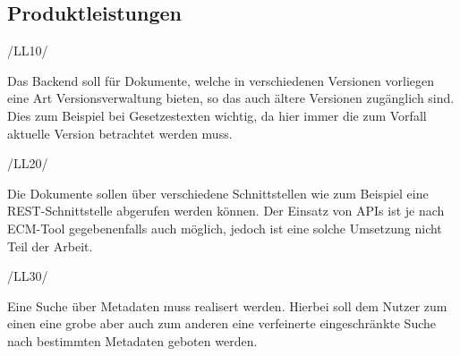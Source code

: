 \subsection{Produktleistungen} \label{Produktleistungen}
\begin{minipage}{3cm}
/LL10/
\end{minipage}
\begin{minipage}{13cm}
Das Backend soll f\"ur Dokumente, welche in verschiedenen Versionen vorliegen eine Art Versionsverwaltung bieten, so das auch \"altere Versionen zug\"anglich sind. Dies zum Beispiel bei Gesetzestexten wichtig, da hier immer die zum Vorfall aktuelle Version betrachtet werden muss.\\
\end{minipage}
\begin{minipage}{3cm}
/LL20/
\end{minipage}
\begin{minipage}{13cm}
Die Dokumente sollen \"uber verschiedene Schnittstellen wie zum Beispiel eine \ac{REST}-Schnittstelle abgerufen werden k\"onnen. Der Einsatz von \ac{API}s ist je nach \ac{ECM}-Tool gegebenenfalls auch m\"oglich, jedoch ist eine solche Umsetzung nicht Teil der Arbeit. \cite{Wiki_REST}\\
\end{minipage}
\begin{minipage}{3cm}
/LL30/
\end{minipage}
\begin{minipage}{13cm}
Eine Suche \"uber Metadaten muss realisert werden. Hierbei soll dem Nutzer zum einen eine grobe aber auch zum anderen eine verfeinerte eingeschr\"ankte Suche nach bestimmten Metadaten geboten werden.\\
\end{minipage}